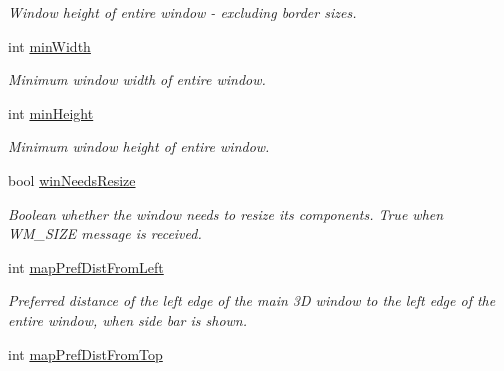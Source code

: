\begin{DoxyCompactItemize}
\begin{DoxyCompactList}\small\item\em Window height of entire window -\/ excluding border sizes. \end{DoxyCompactList}\item 
\hypertarget{class_three_d_viewer_a11cdf1491917f63f0442f4773c4dec1b}{
int \hyperlink{class_three_d_viewer_a11cdf1491917f63f0442f4773c4dec1b}{minWidth}}
\label{class_three_d_viewer_a11cdf1491917f63f0442f4773c4dec1b}

\begin{DoxyCompactList}\small\item\em Minimum window width of entire window. \end{DoxyCompactList}\item 
\hypertarget{class_three_d_viewer_aeb16a4ee12975ae3dca8a69751a7b666}{
int \hyperlink{class_three_d_viewer_aeb16a4ee12975ae3dca8a69751a7b666}{minHeight}}
\label{class_three_d_viewer_aeb16a4ee12975ae3dca8a69751a7b666}

\begin{DoxyCompactList}\small\item\em Minimum window height of entire window. \end{DoxyCompactList}\item 
\hypertarget{class_three_d_viewer_ac0f5a52f02935b89dd3b27a50b9b79ab}{
bool \hyperlink{class_three_d_viewer_ac0f5a52f02935b89dd3b27a50b9b79ab}{winNeedsResize}}
\label{class_three_d_viewer_ac0f5a52f02935b89dd3b27a50b9b79ab}

\begin{DoxyCompactList}\small\item\em Boolean whether the window needs to resize its components. True when WM\_\-SIZE message is received. \end{DoxyCompactList}\item 
\hypertarget{class_three_d_viewer_a9432edba6484d9de7ddf427632feebfb}{
int \hyperlink{class_three_d_viewer_a9432edba6484d9de7ddf427632feebfb}{mapPrefDistFromLeft}}
\label{class_three_d_viewer_a9432edba6484d9de7ddf427632feebfb}

\begin{DoxyCompactList}\small\item\em Preferred distance of the left edge of the main 3D window to the left edge of the entire window, when side bar is shown. \end{DoxyCompactList}\item 
\hypertarget{class_three_d_viewer_a38c39fa64616d7cd7e754c13a7e44556}{
int \hyperlink{class_three_d_viewer_a38c39fa64616d7cd7e754c13a7e44556}{mapPrefDistFromTop}}
\label{class_three_d_viewer_a38c39fa64616d7cd7e754c13a7e44556}


\end{DoxyCompactItemize}

